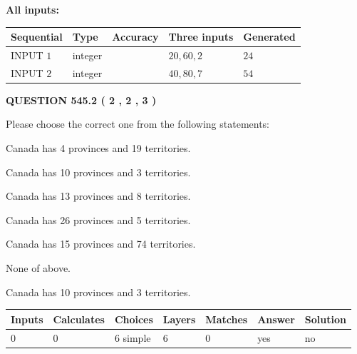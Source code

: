 \documentclass[12pt]{article}
\begin{document}
   
   
   
\noindent\vspace{0.1in}\hspace{-0.08in} {\textbf{\Large{All inputs: }}}
   
   
  
  
\noindent\begin{tabular}{|l|l|l|l|l|}
\hline
 Sequential & Type & Accuracy & Three inputs & Generated \\ 
\hline
 
 
  INPUT $  1 $ & integer &  & $
 20
 , 
 60
 , 
 2
 $ & $ 24 $ 
 \\  \hline  
 
 
  INPUT $  2 $ & integer &  & $
 40
 , 
 80
 , 
 7
 $ & $ 54 $ 
 \\  \hline  
 \end{tabular}
   
   
  
\vspace{0.2in}
  
{\textbf{\Large{QUESTION
545.2 
 ( 2 , 2 , 3 )
}}}
  
  
Please choose the correct one from the following statements:
 
 
Canada has   4 provinces and  19 territories.
 
 
Canada has 10  provinces and 3 territories.
 
 
Canada has  13 provinces and  8 territories.
 
 
Canada has  26 provinces and  5 territories.
 
 
Canada has  15 provinces and  74 territories.
 
 
 None of above.
 
 
\noindent{}
 
 
Canada has 10  provinces and 3 territories.
 
 
\noindent{}
 
 
   
   
   
   
\noindent\begin{tabular}{|l|l|l|l|l|l|l|}
 \hline
Inputs & Calculates & Choices & Layers & Matches & Answer & Solution \\ \hline
 0  & 
 0  & 
 6
  simple  
  & 
 6  & 
 0  & 
  yes & 
  no 
  \\ \hline
 \end{tabular}
   
\end{document}
